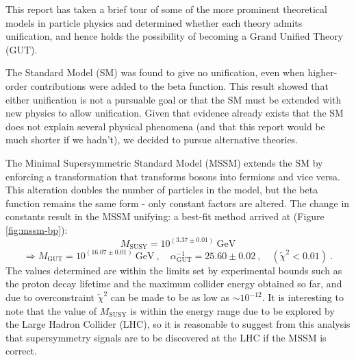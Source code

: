 \documentclass[12pt,a4paper,oneside]{article}
\begin{document}
This report has taken a brief tour of some of the more prominent theoretical models in particle physics and determined whether each theory admits unification, and hence holds the possibility of becoming a Grand Unified Theory (GUT).

The Standard Model (SM) was found to give no unification, even when higher-order contributions were added to the beta function. This result showed that either unification is not a pursuable goal or that the SM must be extended with new physics to allow unification. Given that evidence already exists that the SM does not explain several physical phenomena (and that this report would be much shorter if we hadn't), we decided to pursue alternative theories.

The Minimal Supersymmetric Standard Model (MSSM) extends the SM by enforcing a transformation that transforms bosons into fermions and vice versa. This alteration doubles the number of particles in the model, but the beta function remains the same form - only constant factors are altered. The change in constants result in the MSSM unifying: a best-fit method arrived at (Figure \ref{fig:mssm-bp}):
\vspace{1em}
\singlespace
\[ M_\mathrm{SUSY} = 10^{(3.37 \pm 0.01)} \:\mathrm{GeV} \]
\[ \Rightarrow M_\mathrm{GUT} = 10^{(16.07 \pm 0.01)} \:\mathrm{GeV}\:, \quad \alpha_\mathrm{GUT}^{-1} = 25.60 \pm 0.02 \:, \quad (\overleftarrow{\chi}^2 < 0.01) \:. \]
\doublespace
The values determined are within the limits set by experimental bounds such as the proton decay lifetime and the maximum collider energy obtained so far, and due to overconstraint $\overleftarrow{\chi}^2$ can be made to be as low as $\sim 10^{-12}$. It is interesting to note that the value of $M_\mathrm{SUSY}$ is within the energy range due to be explored by the Large Hadron Collider (LHC), so it is reasonable to suggest from this analysis that supersymmetry signals are to be discovered at the LHC if the MSSM is correct.
\end{document}
